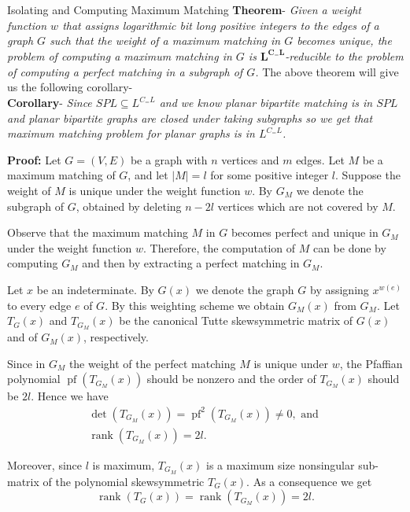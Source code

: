 \documentclass{beamer}
\begin{document}
\begin{frame}[allowframebreaks]{Isolating and Computing Maximum Matching}
	\textbf{Theorem}- \textit{Given a weight function $w$ that assigns
	logarithmic bit long positive integers to the edges of a
	graph $G$ such that the weight of a maximum matching
	in $G$ becomes unique, the problem of computing a maximum matching in $G$ is $\mathbf{L}^{\mathbf{C}_{=}\mathbf{L}} $-reducible to the problem of computing a perfect matching in a subgraph of $G$.} \break
	The above theorem will give us the following corollary-
	 \\ \textbf{Corollary}- \textit{Since $SPL\subseteq L^{C_{=}L}$ and we know planar bipartite matching is in $SPL$ and planar bipartite graphs are closed under taking subgraphs so we get that maximum matching problem for planar graphs is in $L^{C_=L}$.}
	
	\textbf{Proof:} Let $G=(V, E)$ be a graph with $n$ vertices and $m$ edges. Let $M$ be a maximum matching of $G$, and let $|M|=l$ for some positive integer $l$. Suppose the weight of $M$ is unique under the weight function $w$. By $G_M$ we denote the subgraph of $G$, obtained by deleting $n-2 l$ vertices which are not covered by $M$.
	
	Observe that the maximum matching $M$ in $G$ becomes perfect and unique in $G_M$ under the weight function $w$. Therefore, the computation of $M$ can be done by computing $G_M$ and then by extracting a perfect matching in $G_M$.
	
	Let $x$ be an indeterminate. By $G(x)$ we denote the graph $G$ by assigning $x^{w(e)}$ to every edge $e$ of $G$. By this weighting scheme we obtain $G_M(x)$ from $G_M$. Let $T_G(x)$ and $T_{G_M}(x)$ be the canonical Tutte skewsymmetric matrix of $G(x)$ and of $G_M(x)$, respectively.
	
	Since in $G_M$ the weight of the perfect matching $M$ is unique under $w$, the Pfaffian polynomial $\operatorname{pf}\left(T_{G_M}(x)\right)$ should be nonzero and the order of $T_{G_M}(x)$ should be $2 l$. Hence we have
	$$
	\begin{gathered}
		\operatorname{det}\left(T_{G_M}(x)\right)=\operatorname{pf}^2\left(T_{G_M}(x)\right) \neq 0, \text { and } \\
		\operatorname{rank}\left(T_{G_M}(x)\right)=2 l .
	\end{gathered}
	$$
	
	Moreover, since $l$ is maximum, $T_{G_M}(x)$ is a maximum size nonsingular sub-matrix of the polynomial skewsymmetric $T_G(x)$. As a consequence we get
	$$
	\operatorname{rank}\left(T_G(x)\right)=\operatorname{rank}\left(T_{G_M}(x)\right)=2 l .
	$$
	

\end{frame}
\end{document}
